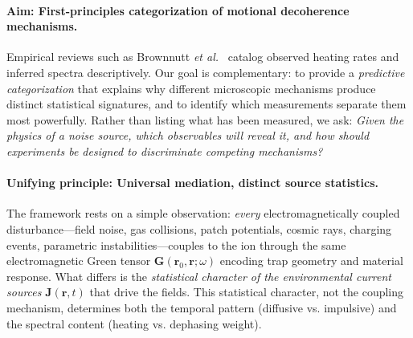 \paragraph{Aim: First-principles categorization of motional decoherence mechanisms.} 
Empirical reviews such as Brownnutt \textit{et al.}~\cite{Brownnutt2015} catalog observed heating rates and inferred spectra descriptively. Our goal is complementary: to provide a \emph{predictive categorization} that explains why different microscopic mechanisms produce distinct statistical signatures, and to identify which measurements separate them most powerfully. Rather than listing what has been measured, we ask: \emph{Given the physics of a noise source, which observables will reveal it, and how should experiments be designed to discriminate competing mechanisms?}

\paragraph{Unifying principle: Universal mediation, distinct source statistics.}
The framework rests on a simple observation: \emph{every} electromagnetically coupled disturbance—field noise, gas collisions, patch potentials, cosmic rays, charging events, parametric instabilities—couples to the ion through the same electromagnetic Green tensor $\mathbf{G}(\mathbf{r}_0,\mathbf{r};\omega)$ encoding trap geometry and material response. What differs is the \emph{statistical character of the environmental current sources} $\mathbf{J}(\mathbf{r},t)$ that drive the fields. This statistical character, not the coupling mechanism, determines both the temporal pattern (diffusive vs. impulsive) and the spectral content (heating vs. dephasing weight).

